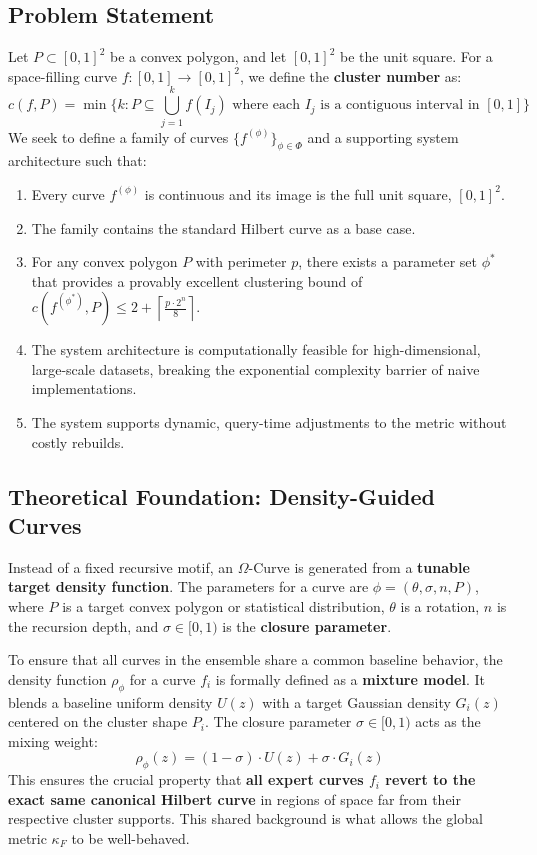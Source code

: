 \documentclass[sigconf]{acmart}
\begin{document}
\subsection{Problem Statement}
Let $P \subset [0,1]^2$ be a convex polygon, and let $[0,1]^2$ be the unit square. For a space-filling curve $f: [0,1] \to [0,1]^2$, we define the \textbf{cluster number} as:
\begin{equation}
 c(f,P) = \min\{k : P \subseteq \bigcup_{j=1}^k f(I_j) \text{ where each } I_j \text{ is a contiguous interval in } [0,1]\}
\end{equation}
We seek to define a family of curves $\{f^{(\phi)}\}_{\phi\in\Phi}$ and a supporting system architecture such that:
\begin{enumerate}
    \item Every curve $f^{(\phi)}$ is continuous and its image is the full unit square, $[0,1]^2$.
    \item The family contains the standard Hilbert curve as a base case.
    \item For any convex polygon $P$ with perimeter $p$, there exists a parameter set $\phi^*$ that provides a provably excellent clustering bound of $c(f^{(\phi^*)}, P) \leq 2 + \left\lceil \frac{p \cdot 2^n}{8} \right\rceil$.
    \item The system architecture is computationally feasible for high-dimensional, large-scale datasets, breaking the exponential complexity barrier of naive implementations.
    \item The system supports dynamic, query-time adjustments to the metric without costly rebuilds.
\end{enumerate}

\subsection{Theoretical Foundation: Density-Guided Curves}
Instead of a fixed recursive motif, an $\Omega$-Curve is generated from a \textbf{tunable target density function}. The parameters for a curve are $\phi = (\theta, \sigma, n, P)$, where $P$ is a target convex polygon or statistical distribution, $\theta$ is a rotation, $n$ is the recursion depth, and $\sigma \in [0,1)$ is the \textbf{closure parameter}.

To ensure that all curves in the ensemble share a common baseline behavior, the density function $\rho_{\phi}$ for a curve $f_i$ is formally defined as a \textbf{mixture model}. It blends a baseline uniform density $U(z)$ with a target Gaussian density $G_i(z)$ centered on the cluster shape $P_i$. The closure parameter $\sigma \in [0,1)$ acts as the mixing weight:
\begin{equation}
 \rho_{\phi}(z) = (1 - \sigma) \cdot U(z) + \sigma \cdot G_i(z)
\end{equation}
This ensures the crucial property that \textbf{all expert curves $f_i$ revert to the exact same canonical Hilbert curve} in regions of space far from their respective cluster supports. This shared background is what allows the global metric $\kappa_F$ to be well-behaved.
\end{document}
